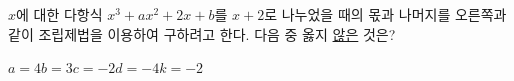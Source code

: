 \noindent\begin{minipage}[t]{0.58\linewidth}\vspace{0pt}\raggedright $x$에 대한 다항식 $x^3+ax^2+2x+b$를 $x+2$로 나누었을 때의 몫과 나머지를 오른쪽과 같이 조립제법을 이용하여 구하려고 한다. 다음 중 옳지 \underline{않은} 것은? \end{minipage}\hfill\begin{minipage}[t]{0.4\linewidth}\vspace{0pt}\centering \resizebox{\ifdim\width>\linewidth\linewidth\else\width\fi}{!}{}\end{minipage}\par
\begin{choices32}{$a=4$}{$b=3$}{$c=-2$}{$d=-4$}{$k=-2$}\end{choices32}
